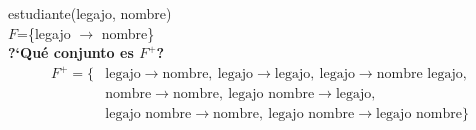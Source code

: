 \documentclass[preview]{standalone}
\begin{document}
estudiante(legajo, nombre)\\
$F$=\{legajo $\rightarrow$ nombre\}\\

\textbf{?`Qu\'e conjunto es $F^+$?}\\
\begin{align*}
	F^+ = \big\{ & \text{legajo} \rightarrow \text{nombre},\ \text{legajo} \rightarrow \text{legajo},\ \text{legajo} \rightarrow \text{nombre legajo},\\
 & \text{nombre} \rightarrow \text{nombre}, \ \text{legajo nombre} \rightarrow \text{legajo},\\  
 & \text{legajo nombre} \rightarrow \text{nombre}, \ \text{legajo nombre} \rightarrow \text{legajo nombre} \big\}   
\end{align*}
\end{document}
